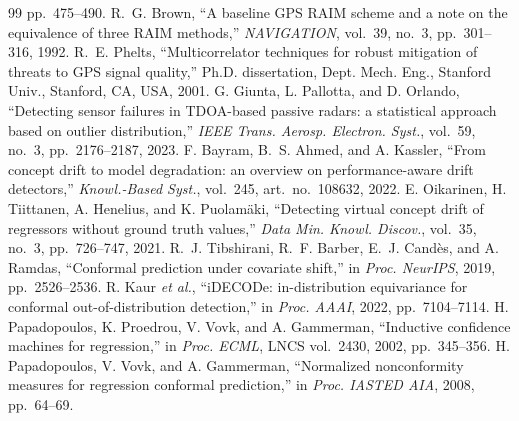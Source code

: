 \documentclass{article}
\newcommand{\etal}{\textit{et al.}}
\begin{document}
\begin{thebibliography}{99}
pp.~475--490.
 R.~G. Brown, ``A baseline GPS RAIM scheme and a note
on the equivalence of three RAIM methods,'' \emph{NAVIGATION}, vol.~39,
no.~3, pp.~301--316, 1992.
 R.~E. Phelts, ``Multicorrelator techniques for
robust mitigation of threats to GPS signal quality,'' Ph.D. dissertation,
Dept. Mech. Eng., Stanford Univ., Stanford, CA, USA, 2001.
 G. Giunta, L. Pallotta, and D. Orlando, ``Detecting
sensor failures in TDOA-based passive radars: a statistical approach
based on outlier distribution,'' \emph{IEEE Trans. Aerosp. Electron.
Syst.}, vol.~59, no.~3, pp.~2176--2187, 2023.
 F. Bayram, B.~S. Ahmed, and A. Kassler, ``From
concept drift to model degradation: an overview on performance-aware
drift detectors,'' \emph{Knowl.-Based Syst.}, vol.~245, art.~no.~108632,
2022.
 E. Oikarinen, H. Tiittanen, A. Henelius, and
K. Puolam\"{a}ki, ``Detecting virtual concept drift of regressors without
ground truth values,'' \emph{Data Min. Knowl. Discov.}, vol.~35, no.~3,
pp.~726--747, 2021.
 R.~J. Tibshirani, R.~F. Barber, E.~J. Cand\`{e}s,
and A. Ramdas, ``Conformal prediction under covariate shift,'' in
\emph{Proc. NeurIPS}, 2019, pp.~2526--2536.
 R. Kaur \etal, ``iDECODe: in-distribution
equivariance for conformal out-of-distribution detection,'' in
\emph{Proc. AAAI}, 2022, pp.~7104--7114.
 H. Papadopoulos, K. Proedrou, V. Vovk, and
A. Gammerman, ``Inductive confidence machines for regression,'' in
\emph{Proc. ECML}, LNCS vol.~2430, 2002,
pp.~345--356.
 H. Papadopoulos, V. Vovk, and A. Gammerman,
``Normalized nonconformity measures for regression conformal
prediction,'' in \emph{Proc. IASTED AIA}, 2008, pp.~64--69.
\end{thebibliography}
\end{document}
